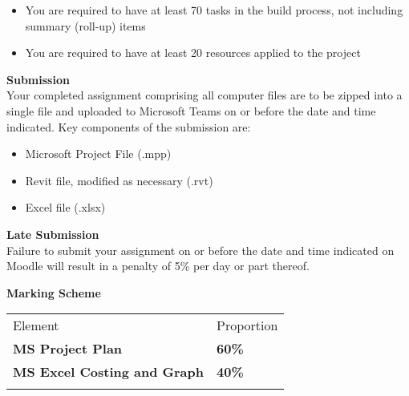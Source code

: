 \begin{itemize}
	\item You are required to have at least 70 tasks in the build process, not including summary (roll-up) items
	\item You are required to have at least 20 resources applied to the project
\end{itemize}




\newpage


\textbf{Submission}\\
Your completed assignment comprising all computer files are to be zipped into a single file and uploaded to Microsoft Teams on or before the date and time indicated.  Key components of the submission are:
\begin{itemize}
	\item Microsoft Project File (.mpp)
	\item Revit file, modified as necessary (.rvt)
	\item Excel file (.xlsx)
\end{itemize}




\textbf{Late Submission}\\
Failure to submit your assignment on or before the date and time indicated on Moodle will result in a penalty of 5\% per day or part thereof.

\vspace{0.5cm}
\textbf{Marking Scheme}

\begin{table}[h!]
     \begin{center}
     \begin{tabular}{p{5cm}  p{5cm} }
     \toprule
      \textbf\large{Element} & \textbf\large{Proportion} \\ 
    \cmidrule(r){1-1}\cmidrule(lr){2-2}
      \textbf{MS Project Plan } & \textbf{60\%}\\
      \textbf{MS Excel Costing and Graph} & \textbf{40\%}\\
      \\ \bottomrule
      \end{tabular}
      \label{tbl:markSchemeAsmt3}
      \end{center}
 \end{table}


